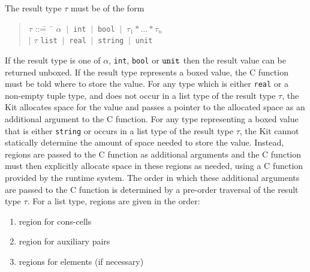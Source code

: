 \documentclass[12pt]{book}
\begin{document}
\noindent The result type $\tau$ must be of the form
\begin{quote}
\begin{tabbing}
$\tau$ ::\== ~\= $\alpha$ $~|~$ {\tt int} $~|~$ {\tt bool} $~|~$ $\tau_1 \ast \ldots
             \ast \tau_n$ \\ \> $|$ \> $\tau$ {\tt list} $~|~$ {\tt real}
             $~|~$ {\tt string} $~|~$ {\tt unit}
\end{tabbing}
\end{quote}
\noindent
If the result type is one of $\alpha$, {\tt int}, {\tt bool} or ${\tt unit}$ then the
result value can be returned unboxed. If the result type represents a
boxed value, the C function must be told where to store the value. For
any type which is either {\tt real} or a non-empty tuple type, and
does not occur in a list type of the result type $\tau$, the Kit
allocates space for the value and passes a pointer to the allocated
space as an additional argument to the C function. For any type
representing a boxed value that is either {\tt string} or occurs in a
list type of the result type $\tau$, the Kit cannot statically
determine the amount of space needed to store the value. Instead,
regions are passed to the C function as additional arguments and the C
function must then explicitly allocate space in these regions as
needed, using a C function provided by the runtime system. The order
in which these additional arguments are passed to the C function is determined
by a pre-order traversal of the result type $\tau$.  For a list type,
regions are given in the order:
\begin{enumerate}
    \item region for cons-cells
    \item region for auxiliary pairs
    \item regions for elements (if necessary)
\end{enumerate}
\end{document}
